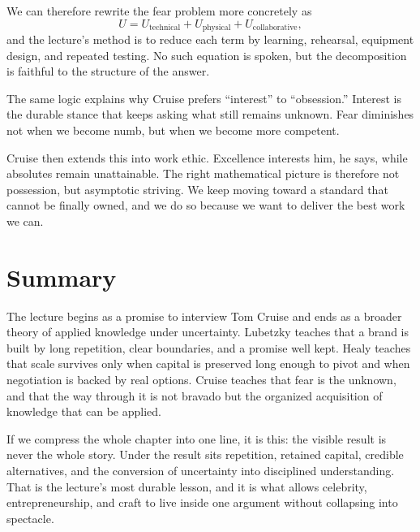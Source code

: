 We can therefore rewrite the fear problem more concretely as
\begin{equation}
U = U_{\mathrm{technical}} + U_{\mathrm{physical}} + U_{\mathrm{collaborative}},
\end{equation}
and the lecture's method is to reduce each term by learning, rehearsal, equipment design, and repeated testing. No such equation is spoken, but the decomposition is faithful to the structure of the answer.

The same logic explains why Cruise prefers ``interest'' to ``obsession.'' Interest is the durable stance that keeps asking what still remains unknown. Fear diminishes not when we become numb, but when we become more competent.

Cruise then extends this into work ethic. Excellence interests him, he says, while absolutes remain unattainable. The right mathematical picture is therefore not possession, but asymptotic striving. We keep moving toward a standard that cannot be finally owned, and we do so because we want to deliver the best work we can.

\section{Summary}

The lecture begins as a promise to interview Tom Cruise and ends as a broader theory of applied knowledge under uncertainty. Lubetzky teaches that a brand is built by long repetition, clear boundaries, and a promise well kept. Healy teaches that scale survives only when capital is preserved long enough to pivot and when negotiation is backed by real options. Cruise teaches that fear is the unknown, and that the way through it is not bravado but the organized acquisition of knowledge that can be applied.

If we compress the whole chapter into one line, it is this: the visible result is never the whole story. Under the result sits repetition, retained capital, credible alternatives, and the conversion of uncertainty into disciplined understanding. That is the lecture's most durable lesson, and it is what allows celebrity, entrepreneurship, and craft to live inside one argument without collapsing into spectacle.